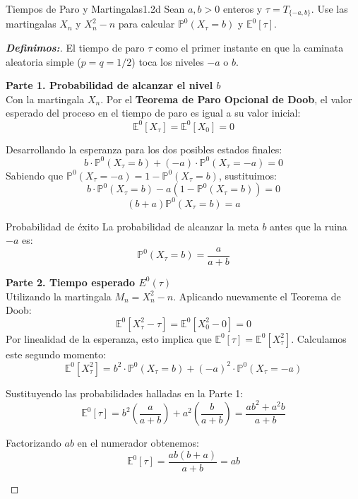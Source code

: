 \documentclass[10pt,a4paper]{article}
\begin{document}
\newpage

\begin{ejercicio}{Tiempos de Paro y Martingalas}{1.2d}
    Sean $a, b > 0$ enteros y $\tau = T_{\{-a, b\}}$. Use las martingalas $X_n$ y $X_n^2 - n$ para calcular $\mathbb{P}^0(X_\tau = b)$ y $\mathbb{E}^0[\tau]$.
\end{ejercicio}

\begin{proof}[\textbf{Definimos:}]
    El tiempo de paro $\tau$ como el primer instante en que la caminata aleatoria simple ($p=q=1/2$) toca los niveles $-a$ o $b$.
    
    \vspace{2mm}

    \textbf{Parte 1. Probabilidad de alcanzar el nivel $b$} \\
    Con la martingala $X_n$. Por el \textbf{Teorema de Paro Opcional de Doob}, el valor esperado del proceso en el tiempo de paro es igual a su valor inicial:
    \[ \mathbb{E}^0[X_\tau] = \mathbb{E}^0[X_0] = 0 \]
    
    Desarrollando la esperanza para los dos posibles estados finales:
    \[ b \cdot \mathbb{P}^0(X_\tau = b) + (-a) \cdot \mathbb{P}^0(X_\tau = -a) = 0 \]
    Sabiendo que $\mathbb{P}^0(X_\tau = -a) = 1 - \mathbb{P}^0(X_\tau = b)$, sustituimos:
    \[ b \cdot \mathbb{P}^0(X_\tau = b) - a(1 - \mathbb{P}^0(X_\tau = b)) = 0 \]
    \[ (b + a)\mathbb{P}^0(X_\tau = b) = a \]
    
    \begin{alerta}{Probabilidad de éxito}
        La probabilidad de alcanzar la meta $b$ antes que la ruina $-a$ es:
        \[ \mathbb{P}^0(X_\tau = b) = \frac{a}{a+b} \]
    \end{alerta}

    \vspace{5mm}

    \textbf{Parte 2. Tiempo esperado $E^{0}(\tau)$} \\
    Utilizando la martingala $M_n = X_n^2 - n$. Aplicando nuevamente el Teorema de Doob:
    \[ \mathbb{E}^0[X_\tau^2 - \tau] = \mathbb{E}^0[X_0^2 - 0] = 0 \]
    Por linealidad de la esperanza, esto implica que $\mathbb{E}^0[\tau] = \mathbb{E}^0[X_\tau^2]$. Calculamos este segundo momento:
    \[ \mathbb{E}^0[X_\tau^2] = b^2 \cdot \mathbb{P}^0(X_\tau = b) + (-a)^2 \cdot \mathbb{P}^0(X_\tau = -a) \]
    
    Sustituyendo las probabilidades halladas en la Parte 1:
    \[ \mathbb{E}^0[\tau] = b^2 \left( \frac{a}{a+b} \right) + a^2 \left( \frac{b}{a+b} \right) = \frac{ab^2 + a^2b}{a+b} \]
    
    \begin{nota}{}
        Factorizando $ab$ en el numerador obtenemos:
        \[ \mathbb{E}^0[\tau] = \frac{ab(b+a)}{a+b} = ab \]
    \end{nota}

   
\end{proof}
\end{document}

